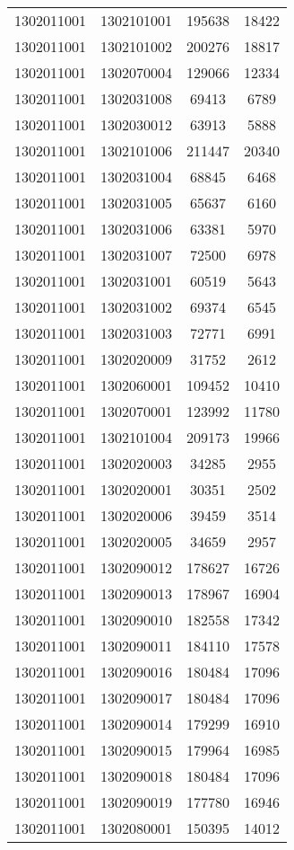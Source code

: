 \begin{longtable}{llcc}
1302011001 & 1302101001 & 195638 & 18422\\
1302011001 & 1302101002 & 200276 & 18817\\
1302011001 & 1302070004 & 129066 & 12334\\
1302011001 & 1302031008 & 69413 & 6789\\
1302011001 & 1302030012 & 63913 & 5888\\
1302011001 & 1302101006 & 211447 & 20340\\
1302011001 & 1302031004 & 68845 & 6468\\
1302011001 & 1302031005 & 65637 & 6160\\
1302011001 & 1302031006 & 63381 & 5970\\
1302011001 & 1302031007 & 72500 & 6978\\
1302011001 & 1302031001 & 60519 & 5643\\
1302011001 & 1302031002 & 69374 & 6545\\
1302011001 & 1302031003 & 72771 & 6991\\
1302011001 & 1302020009 & 31752 & 2612\\
1302011001 & 1302060001 & 109452 & 10410\\
1302011001 & 1302070001 & 123992 & 11780\\
1302011001 & 1302101004 & 209173 & 19966\\
1302011001 & 1302020003 & 34285 & 2955\\
1302011001 & 1302020001 & 30351 & 2502\\
1302011001 & 1302020006 & 39459 & 3514\\
1302011001 & 1302020005 & 34659 & 2957\\
1302011001 & 1302090012 & 178627 & 16726\\
1302011001 & 1302090013 & 178967 & 16904\\
1302011001 & 1302090010 & 182558 & 17342\\
1302011001 & 1302090011 & 184110 & 17578\\
1302011001 & 1302090016 & 180484 & 17096\\
1302011001 & 1302090017 & 180484 & 17096\\
1302011001 & 1302090014 & 179299 & 16910\\
1302011001 & 1302090015 & 179964 & 16985\\
1302011001 & 1302090018 & 180484 & 17096\\
1302011001 & 1302090019 & 177780 & 16946\\
1302011001 & 1302080001 & 150395 & 14012\\

\end{longtable}
